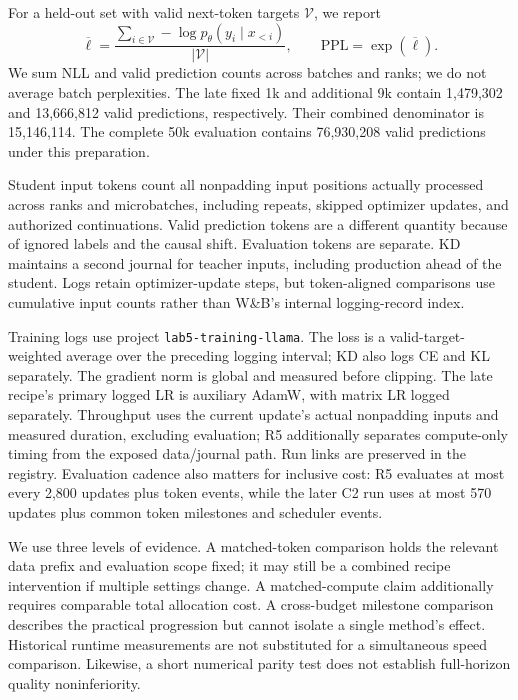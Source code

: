 For a held-out set with valid next-token targets $\mathcal{V}$, we report
\begin{equation}
  \overline{\ell}=\frac{\sum_{i\in\mathcal{V}}-\log p_\theta(y_i\mid x_{<i})}{|\mathcal{V}|},
  \qquad \mathrm{PPL}=\exp(\overline{\ell}).
\end{equation}
We sum NLL and valid prediction counts across batches and ranks; we do not average batch perplexities. The late fixed 1k and additional 9k contain 1,479,302 and 13,666,812 valid predictions, respectively. Their combined denominator is 15,146,114. The complete 50k evaluation contains 76,930,208 valid predictions under this preparation.

Student input tokens count all nonpadding input positions actually processed across ranks and microbatches, including repeats, skipped optimizer updates, and authorized continuations. Valid prediction tokens are a different quantity because of ignored labels and the causal shift. Evaluation tokens are separate. KD maintains a second journal for teacher inputs, including production ahead of the student. Logs retain optimizer-update steps, but token-aligned comparisons use cumulative input counts rather than W\&B's internal logging-record index.

Training logs use project \texttt{lab5-training-llama}. The loss is a valid-target-weighted average over the preceding logging interval; KD also logs CE and KL separately. The gradient norm is global and measured before clipping. The late recipe's primary logged LR is auxiliary AdamW, with matrix LR logged separately. Throughput uses the current update's actual nonpadding inputs and measured duration, excluding evaluation; R5 additionally separates compute-only timing from the exposed data/journal path. Run links are preserved in the registry. Evaluation cadence also matters for inclusive cost: R5 evaluates at most every 2,800 updates plus token events, while the later C2 run uses at most 570 updates plus common token milestones and scheduler events.

We use three levels of evidence. A matched-token comparison holds the relevant data prefix and evaluation scope fixed; it may still be a combined recipe intervention if multiple settings change. A matched-compute claim additionally requires comparable total allocation cost. A cross-budget milestone comparison describes the practical progression but cannot isolate a single method's effect. Historical runtime measurements are not substituted for a simultaneous speed comparison. Likewise, a short numerical parity test does not establish full-horizon quality noninferiority.

